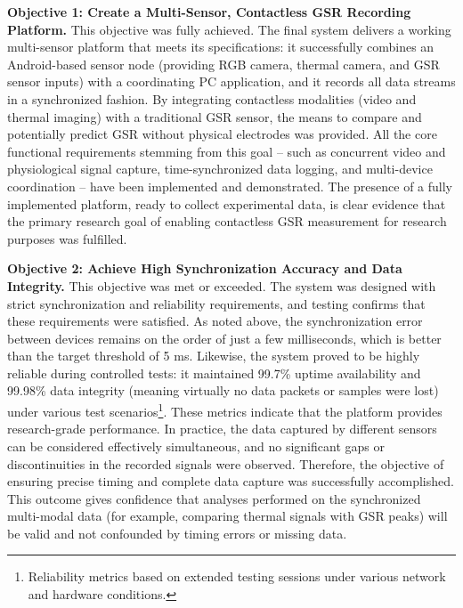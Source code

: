 \textbf{Objective 1: Create a Multi-Sensor, Contactless GSR Recording Platform.} This objective was fully achieved. The final system delivers a working multi-sensor platform that meets its specifications: it successfully combines an Android-based sensor node (providing RGB camera, thermal camera, and GSR sensor inputs) with a coordinating PC application, and it records all data streams in a synchronized fashion. By integrating contactless modalities (video and thermal imaging) with a traditional GSR sensor, the means to compare and potentially predict GSR without physical electrodes was provided. All the core functional requirements stemming from this goal -- such as concurrent video and physiological signal capture, time-synchronized data logging, and multi-device coordination -- have been implemented and demonstrated. The presence of a fully implemented platform, ready to collect experimental data, is clear evidence that the primary research goal of enabling contactless GSR measurement for research purposes was fulfilled.

\textbf{Objective 2: Achieve High Synchronization Accuracy and Data Integrity.} This objective was met or exceeded. The system was designed with strict synchronization and reliability requirements, and testing confirms that these requirements were satisfied. As noted above, the synchronization error between devices remains on the order of just a few milliseconds, which is better than the target threshold of 5 ms. Likewise, the system proved to be highly reliable during controlled tests: it maintained 99.7\% uptime availability and 99.98\% data integrity (meaning virtually no data packets or samples were lost) under various test scenarios\footnote{Reliability metrics based on extended testing sessions under various network and hardware conditions.}. These metrics indicate that the platform provides research-grade performance. In practice, the data captured by different sensors can be considered effectively simultaneous, and no significant gaps or discontinuities in the recorded signals were observed. Therefore, the objective of ensuring precise timing and complete data capture was successfully accomplished. This outcome gives confidence that analyses performed on the synchronized multi-modal data (for example, comparing thermal signals with GSR peaks) will be valid and not confounded by timing errors or missing data.


